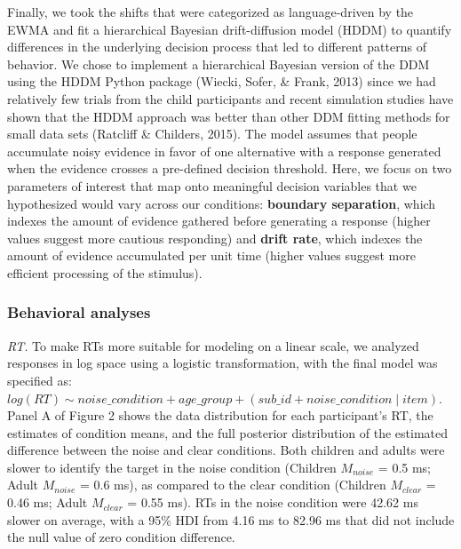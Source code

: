 \documentclass[10pt, letterpaper]{article}
\begin{document}
Finally, we took the shifts that were categorized as language-driven by
the EWMA and fit a hierarchical Bayesian drift-diffusion model (HDDM) to
quantify differences in the underlying decision process that led to
different patterns of behavior. We chose to implement a hierarchical
Bayesian version of the DDM using the HDDM Python package (Wiecki,
Sofer, \& Frank, 2013) since we had relatively few trials from the child
participants and recent simulation studies have shown that the HDDM
approach was better than other DDM fitting methods for small data sets
(Ratcliff \& Childers, 2015). The model assumes that people accumulate
noisy evidence in favor of one alternative with a response generated
when the evidence crosses a pre-defined decision threshold. Here, we
focus on two parameters of interest that map onto meaningful decision
variables that we hypothesized would vary across our conditions:
\textbf{boundary separation}, which indexes the amount of evidence
gathered before generating a response (higher values suggest more
cautious responding) and \textbf{drift rate}, which indexes the amount
of evidence accumulated per unit time (higher values suggest more
efficient processing of the stimulus).

\subsubsection{Behavioral analyses}\label{behavioral-analyses}

\emph{RT.} To make RTs more suitable for modeling on a linear scale, we
analyzed responses in log space using a logistic transformation, with
the final model was specified as:
\texttt{$log(RT) \sim noise\_condition + age\_group + (sub\_id + noise\_condition \mid item)$}.
Panel A of Figure 2 shows the data distribution for each participant's
RT, the estimates of condition means, and the full posterior
distribution of the estimated difference between the noise and clear
conditions. Both children and adults were slower to identify the target
in the noise condition (Children \(M_{noise}\) = 0.5 ms; Adult
\(M_{noise}\) = 0.6 ms), as compared to the clear condition (Children
\(M_{clear}\) = 0.46 ms; Adult \(M_{clear}\) = 0.55 ms). RTs in the
noise condition were 42.62 ms slower on average, with a 95\% HDI from
4.16 ms to 82.96 ms that did not include the null value of zero
condition difference.
\end{document}
